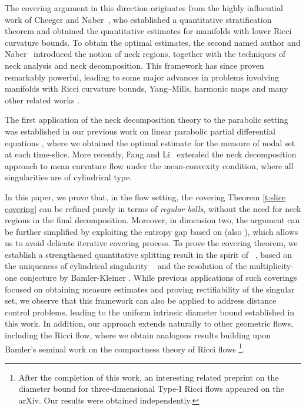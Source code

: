 \documentclass[11pt,reqno]{amsart}
\numberwithin{equation}{section}
\theoremstyle{definition}
\theoremstyle{remark}
\theoremstyle{remark}
\theoremstyle{remark}
\theoremstyle{remark}\newtheorem{conjecture}[equation]{Conjecture}
\theoremstyle{remark}\newtheorem{question}[equation]{Question}
\begin{document}
The covering argument in this direction originates from the highly influential work of Cheeger and Naber~\cite{CN13a}, who established a quantitative stratification theorem and obtained the quantitative estimates for manifolds with lower Ricci curvature bounds. To obtain the optimal estimates, the second named author and Naber~\cite{JN21} introduced the notion of neck regions, together with the techniques of neck analysis and neck decomposition. This framework has since proven remarkably powerful, leading to some major advances in problems involving manifolds with Ricci curvature bounds, Yang–Mills, harmonic maps \cite{NV19,CJN21,NV24} and many other related works \cite{Na18,LN20,Wa20,BNS22,FNS23,HJ23}.

The first application of the neck decomposition theory to the parabolic setting  was established in our previous work on linear parabolic partial differential equations \cite{HJ24}, where we obtained the optimal estimate for the measure of nodal set at each time-slice. More recently, Fang and Li~\cite{FL25} extended the neck decomposition approach to mean curvature flow under the mean-convexity condition, where all singularities are of cylindrical type. 

In this paper, we prove that, in the flow setting, the covering Theorem \ref{t:slice covering} can be refined purely in terms of \emph{regular balls}, without the need for neck regions in the final decomposition. Moreover, in dimension two, the argument can be further simplified by exploiting the entropy gap based on \cite{BL17} (also \cite{CIMW13, Bre16}), which allows us to avoid delicate iterative covering process. To prove the covering theorem, we establish a strengthened quantitative splitting result in the spirit of ~\cite{Wh97,CHN13}, based on the uniqueness of cylindrical singularity ~\cite{CM15,CM25} and the resolution of the multiplicity-one conjecture by Bamler-Kleiner \cite{BK23}. While previous applications of such coverings focused on obtaining measure estimates and proving rectifiability of the singular set, we observe that this framework can also be applied to address distance control problems, leading to the uniform intrinsic diameter bound established in this work. In addition, our approach extends naturally to other geometric flows, including the Ricci flow, where we obtain analogous results building upon Bamler's seminal work on the compactness theory of Ricci flows \cite{Ba20a,Ba20b,Ba20c}\footnote{After the completion of this work, an interesting related preprint \cite{Gi25} on the diameter bound for three-dimensional Type-I Ricci flows appeared on the arXiv. Our results were obtained independently.}.
\end{document}
